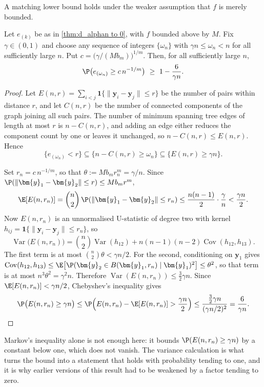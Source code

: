A matching lower bound holds under the weaker assumption that $f$ is merely bounded.

\begin{theorem}\label{thm:lowerbound}
  Let $e_{(k)}$ be as in \cref{thm:d_alphan to 0}, with $f$ bounded above by $M$. Fix $\gamma\in(0,1)$ and choose any sequence of integers $\{\omega_n\}$ with $\gamma n\le\omega_n<n$ for all sufficiently large $n$. Put $c=\big(\gamma/(M b_m)\big)^{1/m}$. Then, for all sufficiently large $n$,
  $$
  \P\big(e_{(\omega_n)}\geq c\,n^{-1/m}\big)\ \geq\ 1-\frac{6}{\gamma n}.
  $$
\end{theorem}

\begin{proof}
  Let $E(n,r)=\sum_{i<j}\mathbf{1}\{\|\bm{y}_i-\bm{y}_j\|\leq r\}$ be the number of pairs within distance $r$, and let $C(n,r)$ be the number of connected components of the graph joining all such pairs. The number of minimum spanning tree edges of length at most $r$ is $n-C(n,r)$, and adding an edge either reduces the component count by one or leaves it unchanged, so $n-C(n,r)\leq E(n,r)$. Hence
  $$
  \{e_{(\omega_n)}<r\}\subseteq\{n-C(n,r)\geq\omega_n\}\subseteq\{E(n,r)\geq\gamma n\}.
  $$

  Set $r_n=c\,n^{-1/m}$, so that $\theta:=M b_m r_n^m=\gamma/n$. Since $\P(\|\bm{y}_1-\bm{y}_2\|\leq r)\leq M b_m r^m$,
  $$
  \E[E(n,r_n)]=\binom n2\,\P(\|\bm{y}_1-\bm{y}_2\|\leq r_n)\leq \frac{n(n-1)}{2}\cdot\frac\gamma n<\frac{\gamma n}2 .
  $$
  Now $E(n,r_n)$ is an unnormalised U-statistic of degree two with kernel $h_{ij}=\mathbf{1}\{\|\bm{y}_i-\bm{y}_j\|\leq r_n\}$, so
  $$
  \operatorname{Var}\big(E(n,r_n)\big)=\binom n2\operatorname{Var}(h_{12})+n(n-1)(n-2)\operatorname{Cov}(h_{12},h_{13}).
  $$
  The first term is at most $\binom n2\theta<\gamma n/2$. For the second, conditioning on $\bm{y}_1$ gives $\operatorname{Cov}(h_{12},h_{13})\leq\E\big[\P(\bm{y}_2\in B(\bm{y}_1,r_n)\mid \bm{y}_1)^2\big]\leq\theta^2$, so that term is at most $n^3\theta^2=\gamma^2 n$. Therefore $\operatorname{Var}(E(n,r_n))\leq \tfrac32\gamma n$. Since $\E[E(n,r_n)]<\gamma n/2$, Chebyshev's inequality gives
  $$
  \P\big(E(n,r_n)\geq\gamma n\big)\leq\P\Big(E(n,r_n)-\E[E(n,r_n)]>\frac{\gamma n}2\Big)
  \leq\frac{\tfrac32\gamma n}{(\gamma n/2)^2}=\frac{6}{\gamma n}. \qedhere
  $$
\end{proof}

Markov's inequality alone is not enough here: it bounds $\P(E(n,r_n)\geq\gamma n)$ by a constant below one, which does not vanish. The variance calculation is what turns the bound into a statement that holds with probability tending to one, and it is why earlier versions of this result had to be weakened by a factor tending to zero.

